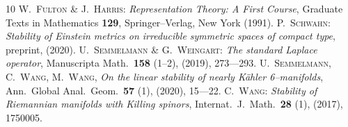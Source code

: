 \documentclass[12pt]{article}
\begin{document}
\begin{thebibliography}{10}
%
 \textsc{W.~Fulton \& J.~Harris:}\quad
 \textit{Representation Theory: A First Course},\quad
 \textrm{Graduate Texts in Mathematics \textbf{129},
  Springer--Verlag, New York (1991).}
%
 \textsc{P.~Schwahn:}\quad
 \textit{Stability of Einstein metrics on irreducible
  symmetric spaces of compact type},\quad
 \textrm{preprint, (2020).}
%
 \textsc{U.~Semmelmann \& G.~Weingart:}\quad
 \textit{The standard Laplace operator},\quad
 \textrm{Manuscripta Math.~\textbf{158} (1--2), (2019), 273---293.} 
%
 \textsc{U.~Semmelmann, C.~Wang, M.~Wang},\quad
 \textit{On the linear stability of nearly Kähler 6--manifolds},\quad
 \textrm{Ann.~Global Anal.~Geom.~\textbf{57} (1), (2020), 15---22.}
% 
 \textsc{C.~Wang:}\quad
 \textit{Stability of Riemannian manifolds with Killing spinors},\quad
 \textrm{Internat.~J.~Math.~\textbf{28} (1), (2017), 1750005.}
%
\end{thebibliography}
%
\end{document}
